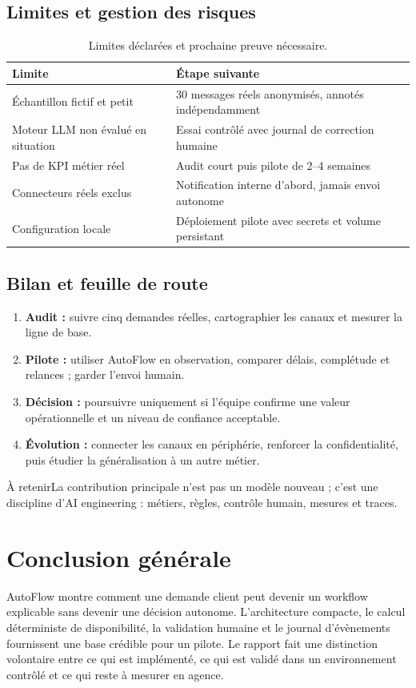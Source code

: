 \documentclass[11pt,a4paper,openany]{report}
\newcommand{\takeaway}[1]{\begin{keybox}{À retenir}#1\end{keybox}}
\begin{document}
\section{Limites et gestion des risques}
\begin{table}[H]\centering\small\caption{Limites déclarées et prochaine preuve nécessaire.}\begin{tabularx}{\linewidth}{X X}\toprule
Limite & Étape suivante\\\midrule
Échantillon fictif et petit & 30 messages réels anonymisés, annotés indépendamment\\
Moteur LLM non évalué en situation & Essai contrôlé avec journal de correction humaine\\
Pas de KPI métier réel & Audit court puis pilote de 2--4 semaines\\
Connecteurs réels exclus & Notification interne d'abord, jamais envoi autonome\\
Configuration locale & Déploiement pilote avec secrets et volume persistant\\\bottomrule
\end{tabularx}\end{table}
\clearpage

\section{Bilan et feuille de route}
\begin{enumerate}[leftmargin=1.3cm,itemsep=9pt]
\item \textbf{Audit :} suivre cinq demandes réelles, cartographier les canaux et mesurer la ligne de base.
\item \textbf{Pilote :} utiliser AutoFlow en observation, comparer délais, complétude et relances ; garder l'envoi humain.
\item \textbf{Décision :} poursuivre uniquement si l'équipe confirme une valeur opérationnelle et un niveau de confiance acceptable.
\item \textbf{Évolution :} connecter les canaux en périphérie, renforcer la confidentialité, puis étudier la généralisation à un autre métier.
\end{enumerate}
\takeaway{La contribution principale n'est pas un modèle nouveau ; c'est une discipline d'AI engineering : métiers, règles, contrôle humain, mesures et traces.}
\clearpage

\chapter*{Conclusion générale}
AutoFlow montre comment une demande client peut devenir un workflow explicable sans devenir une décision autonome. L'architecture compacte, le calcul déterministe de disponibilité, la validation humaine et le journal d'évènements fournissent une base crédible pour un pilote. Le rapport fait une distinction volontaire entre ce qui est implémenté, ce qui est validé dans un environnement contrôlé et ce qui reste à mesurer en agence.
\end{document}
